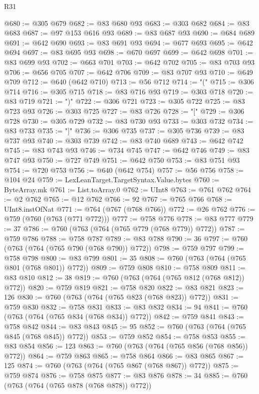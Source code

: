 \begin{lexlean}{R31}
\begin{coremodule}
@680 := @305 @679
@682 := @83 @680 @93
@683 := @303 @682
@684 := @83 @683
@687 := @97 @153 @616 @93
@689 := @83 @687 @93
@690 := @684 @689
@691 := @642 @690
@693 := @83 @691 @93
@694 := @677 @693
@695 := @642 @694
@697 := @83 @695 @93
@698 := @670 @697
@699 := @642 @698
@701 := @83 @699 @93
@702 := @663 @701
@703 := @642 @702
@705 := @83 @703 @93
@706 := @656 @705
@707 := @642 @706
@709 := @83 @707 @93
@710 := @649 @709
@712 := @640 (@642 @710)
@713 := @56 @712
@714 := "("
@715 := @306 @714
@716 := @305 @715
@718 := @83 @716 @93
@719 := @303 @718
@720 := @83 @719
@721 := ")"
@722 := @306 @721
@723 := @305 @722
@725 := @83 @723 @93
@726 := @303 @725
@727 := @83 @726
@728 := "["
@729 := @306 @728
@730 := @305 @729
@732 := @83 @730 @93
@733 := @303 @732
@734 := @83 @733
@735 := "]"
@736 := @306 @735
@737 := @305 @736
@739 := @83 @737 @93
@740 := @303 @739
@742 := @83 @740 @689
@743 := @642 @742
@745 := @83 @743 @93
@746 := @734 @745
@747 := @642 @746
@749 := @83 @747 @93
@750 := @727 @749
@751 := @642 @750
@753 := @83 @751 @93
@754 := @720 @753
@756 := @640 (@642 @754)
@757 := @56 @756
@758 := @104 @24
@759 := LexLeanTarget.TargetSyntax.Value.bytes
@760 := ByteArray.mk
@761 := List.toArray.{0}
@762 := UInt8
@763 := @761 @762
@764 := @2 @762
@765 := @12 @762
@766 := 92
@767 := @765 @766
@768 := UInt8.instOfNat
@771 := @764 (@767 (@768 @766))
@772 := @26 @762
@776 := @759 (@760 (@763 (@771 @772)))
@777 := @758 @776
@778 := @83 @777
@779 := 37
@786 := @760 (@763 (@764 (@765 @779 (@768 @779)) @772))
@787 := @759 @786
@788 := @758 @787
@789 := @83 @788
@790 := 36
@797 := @760 (@763 (@764 (@765 @790 (@768 @790)) @772))
@798 := @759 @797
@799 := @758 @798
@800 := @83 @799
@801 := 35
@808 := @760 (@763 (@764 (@765 @801 (@768 @801)) @772))
@809 := @759 @808
@810 := @758 @809
@811 := @83 @810
@812 := 38
@819 := @760 (@763 (@764 (@765 @812 (@768 @812)) @772))
@820 := @759 @819
@821 := @758 @820
@822 := @83 @821
@823 := 126
@830 := @760 (@763 (@764 (@765 @823 (@768 @823)) @772))
@831 := @759 @830
@832 := @758 @831
@833 := @83 @832
@834 := 94
@841 := @760 (@763 (@764 (@765 @834 (@768 @834)) @772))
@842 := @759 @841
@843 := @758 @842
@844 := @83 @843
@845 := 95
@852 := @760 (@763 (@764 (@765 @845 (@768 @845)) @772))
@853 := @759 @852
@854 := @758 @853
@855 := @83 @854
@856 := 123
@863 := @760 (@763 (@764 (@765 @856 (@768 @856)) @772))
@864 := @759 @863
@865 := @758 @864
@866 := @83 @865
@867 := 125
@874 := @760 (@763 (@764 (@765 @867 (@768 @867)) @772))
@875 := @759 @874
@876 := @758 @875
@877 := @83 @876
@878 := 34
@885 := @760 (@763 (@764 (@765 @878 (@768 @878)) @772))

\end{coremodule}
\end{lexlean}
